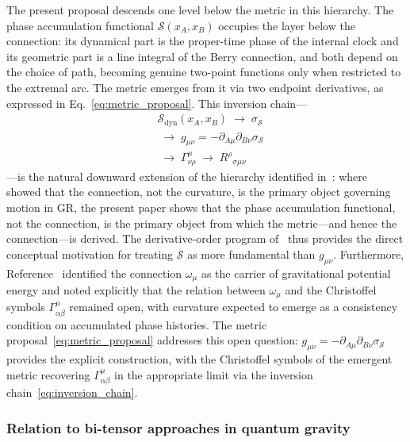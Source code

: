 \documentclass[%
 reprint, amsmath,amssymb, aps, prb, ]{revtex4-2}
\numberwithin{equation}{section}
\begin{document}
The present proposal descends one level below the metric in this hierarchy. The phase accumulation functional $\mathcal{S}(x_A,x_B)$ occupies the layer below the connection: its dynamical part is the proper-time phase of the internal clock and its geometric part is a line integral of the Berry connection, and both depend on the choice of path, becoming genuine two-point functions only when restricted to the extremal arc. The metric emerges from it via two endpoint derivatives, as expressed in Eq.~\eqref{eq:metric_proposal}. This inversion chain---
\begin{equation}
\begin{aligned}
&\mathcal{S}_{\mathrm{dyn}}(x_A,x_B) \;\longrightarrow\; \sigma_{\mathcal{S}}
\\
&\;\longrightarrow\; g_{\mu\nu} = -\partial_{A\mu}\partial_{B\nu}\sigma_{\mathcal{S}}
\\
&\;\longrightarrow\; \Gamma^\mu_{\nu\rho} \;\longrightarrow\; R^\rho{}_{\sigma\mu\nu}
\end{aligned}
\label{eq:inversion_chain}
\end{equation}
---is the natural downward extension of the hierarchy identified in~\cite{hanamura40}: where~\cite{hanamura40} showed that the connection, not the curvature, is the primary object governing motion in GR, the present paper shows that the phase accumulation functional, not the connection, is the primary object from which the metric---and hence the connection---is derived. The derivative-order program of~\cite{hanamura40} thus provides the direct conceptual motivation for treating $\mathcal{S}$ as more fundamental than $g_{\mu\nu}$. Furthermore, Reference~\cite{hanamura37} identified the connection $\omega_\mu$ as the carrier of gravitational potential energy and noted explicitly that the relation between $\omega_\mu$ and the Christoffel symbols $\Gamma^\mu_{\alpha\beta}$ remained open, with curvature expected to emerge as a consistency condition on accumulated phase histories. The metric proposal~\eqref{eq:metric_proposal} addresses this open question: $g_{\mu\nu} = -\partial_{A\mu}\partial_{B\nu}\sigma_{\mathcal{S}}$ provides the explicit construction, with the Christoffel symbols of the emergent metric recovering $\Gamma^\mu_{\alpha\beta}$ in the appropriate limit via the inversion chain~\eqref{eq:inversion_chain}.

\subsubsection{Relation to bi-tensor approaches in quantum gravity}
\label{subsubsec:bitensor}
\end{document}
